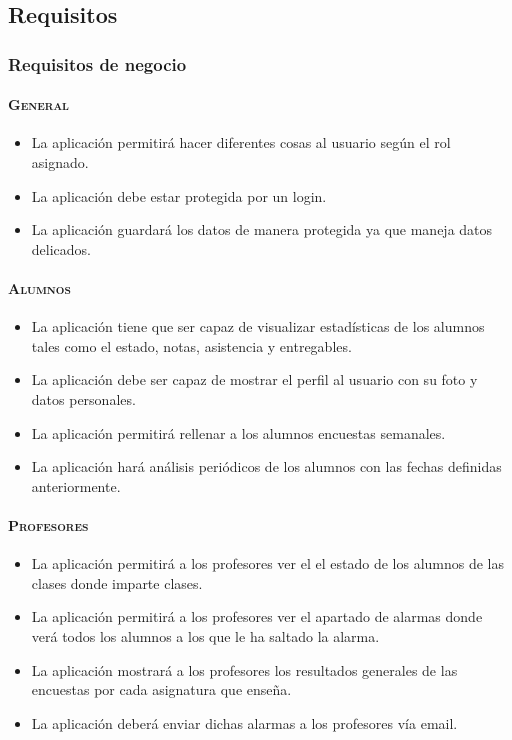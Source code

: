 \subsection{Requisitos}
\subsubsection{Requisitos de negocio}
\paragraph{\textsc {General}}
\begin{itemize}
\item {La aplicación permitirá hacer diferentes cosas al usuario según
  el rol asignado.}
\item {La aplicación debe estar protegida por un login.}
\item {La aplicación guardará los datos de manera protegida ya que
  maneja datos delicados.}
\end{itemize}
\paragraph{\textsc {Alumnos}}
\begin{itemize}
\item {La aplicación tiene que ser capaz de visualizar estadísticas de
  los alumnos tales como el estado, notas, asistencia y entregables.}
\item {La aplicación debe ser capaz de mostrar el perfil al usuario
  con su foto y datos personales.}
\item {La aplicación permitirá rellenar a los alumnos encuestas
  semanales.}
\item {La aplicación hará análisis periódicos de los alumnos con las
  fechas definidas anteriormente.}
\end{itemize}
\paragraph{\textsc {Profesores}}
\begin{itemize}
\item {La aplicación permitirá a los profesores ver el el estado de
  los alumnos de las clases donde imparte clases.}
\item {La aplicación permitirá a los profesores ver el apartado de
  alarmas donde verá todos los alumnos a los que le ha saltado la
  alarma.}
\item {La aplicación mostrará a los profesores los resultados
  generales de las encuestas por cada asignatura que enseña.}
\item {La aplicación deberá enviar dichas alarmas a los profesores vía
  email.}
\end{itemize}
